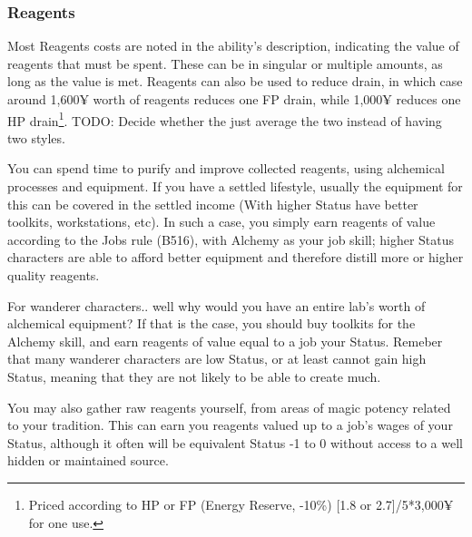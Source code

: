 \begin{multicols*}{2}
	\subsubsection{Reagents}
	
	Most Reagents costs are noted in the ability's description, indicating the value of reagents that must be spent. These can be in singular or multiple amounts, as long as the value is met. Reagents can also be used to reduce drain, in which case around 1,600¥ worth of reagents reduces one FP drain, while 1,000¥ reduces one HP drain\footnote{Priced according to HP or FP (Energy Reserve, -10\%) [1.8 or 2.7]/5*3,000¥ for one use.}. TODO: Decide whether the just average the two instead of having two styles.
	
	You can spend time to purify and improve collected reagents, using alchemical processes and equipment. If you have a settled lifestyle, usually the equipment for this can be covered in the settled income (With higher Status have better toolkits, workstations, etc). In such a case, you simply earn reagents of value according to the Jobs rule (B516), with Alchemy as your job skill; higher Status characters are able to afford better equipment and therefore distill more or higher quality reagents. 
	
	For wanderer characters.. well why would you have an entire lab's worth of alchemical equipment? If that is the case, you should buy toolkits for the Alchemy skill, and earn reagents of value equal to a job your Status. Remeber that many wanderer characters are low Status, or at least cannot gain high Status, meaning that they are not likely to be able to create much.
	
	You may also gather raw reagents yourself, from areas of magic potency related to your tradition. This can earn you reagents valued up to a job's wages of your Status, although it often will be equivalent Status -1 to 0 without access to a well hidden or maintained source.
	
\end{multicols*}